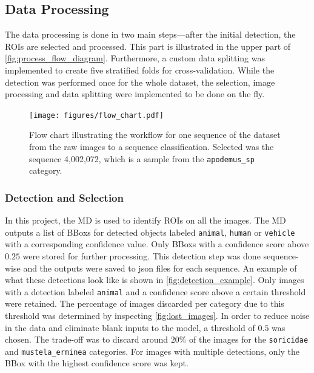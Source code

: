     \subsection{Data Processing}

    The data processing is done in two main steps---after the initial detection, the \acsp{ROI} are selected and processed.
    This part is illustrated in the upper part of \autoref{fig:process_flow_diagram}.
    Furthermore, a custom data splitting was implemented to create five stratified folds for cross-validation.
    While the detection was performed once for the whole dataset, the selection, image processing and data splitting were implemented to be done on the fly.

    \begin{figure}[p]
    \centering
    \texttt{[image: figures/flow\_chart.pdf]}
    \caption{
        Flow chart illustrating the workflow for one sequence of the dataset from the raw images to a sequence classification. 
        Selected was the sequence 4,002,072, which is a sample from the \texttt{apodemus\_sp} category.
        }
    \label{fig:process_flow_diagram}
    \end{figure}

        \subsubsection{Detection and Selection}
        In this project, the \ac{MD} \autocite{beeryEfficientPipelineCamera2019} is used to identify \acsp{ROI} on all the images.
        The \ac{MD} outputs a list of \acp{BBox} for detected objects labeled \texttt{animal}, \texttt{human} or \texttt{vehicle} with a corresponding confidence value.
        Only \acp{BBox} with a confidence score above \(0.25\) were stored for further processing.
        This detection step was done sequence-wise and the outputs were saved to json files for each sequence.
        An example of what these detections look like is shown in \autoref{fig:detection_example}.
        Only images with a detection labeled \texttt{animal} and a confidence score above a certain threshold were retained.
        The percentage of images discarded per category due to this threshold was determined by inspecting \autoref{fig:lost_images}.
        In order to reduce noise in the data and eliminate blank inputs to the model, a threshold of \(0.5\) was chosen.
        The trade-off was to discard around \(20\%\) of the images for the \texttt{soricidae} and \texttt{mustela\_erminea} categories.
        For images with multiple detections, only the \ac{BBox} with the highest confidence score was kept.

